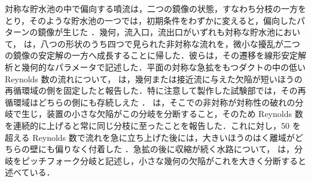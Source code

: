 \begin{ja}
対称な貯水池の中で偏向する噴流は，二つの鏡像の状態，すなわち分枝の一方をとり，そのような貯水池の一つでは，初期条件をわずかに変えると，偏向したパターンの鏡像が生じた \citep{kantoushFlowFieldInvestigation2008}．幾何，流入口，流出口がいずれも対称な貯水池において，\citet{dewalsExperimentalNumericalAnalysis2008} は，八つの形状のうち四つで見られた非対称な流れを，微小な擾乱が二つの鏡像の安定解の一方へ成長することに帰した．彼らは，その遷移を線形安定解析と幾何的なパラメータで記述した．平面の対称な急拡をもつダクトの中の低い Reynolds 数の流れについて，\citet{cherdronAsymmetricFlowsInstabilities1978}\unverified{} は，幾何または接近流に与えた欠陥が短いほうの再循環域の側を固定したと報告した．特に注意して製作した試験部では，その再循環域はどちらの側にも存続しえた \citep{cherdronAsymmetricFlowsInstabilities1978}\unverified{}．\citet{fearnNonlinearFlowPhenomena1990}\unverified{} は，そこでの非対称が対称性の破れの分岐で生じ，装置の小さな欠陥がこの分岐を分断すること，そのため Reynolds 数を連続的に上げると常に同じ分枝に至ったことを報告した．これに対し，50 を超える Reynolds 数で流れを急に立ち上げた後には，大きいほうのはく離域がどちらの壁にも偏りなく付着した \citep{fearnNonlinearFlowPhenomena1990}\unverified{}．急拡の後に収縮が続く水路について，\citet{mullinFlowSymmetricChannel2003} は，分岐をピッチフォーク分岐と記述し，小さな幾何の欠陥がこれを大きく分断すると述べている．
\end{ja}

